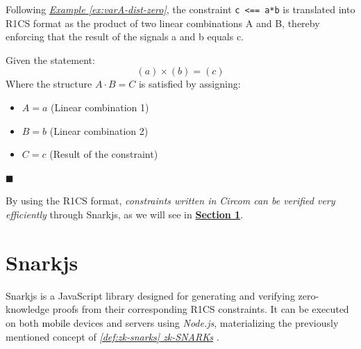 \documentclass[a4paper,12pt]{report}
\begin{document}
	\vspace{0.3cm}
	
	\noindent Following \hyperref[ex:varA-dist-zero]{\textit{Example \ref{ex:varA-dist-zero}}}, the constraint \texttt{c <== a*b} is translated into R1CS format as the product of two linear combinations A and B, thereby enforcing that the result of the signals a and b equals c.
	
	\begin{mi_ejemplo}[H]
		\caption{Multiplication transformation to R1CS format}
		\label{ex:var_zero-to-R1CS-ingles}    
		
		Given the statement:
		\begin{equation*}
			(a) \times (b) = (c)
		\end{equation*}
		Where the structure $A \cdot B = C$ is satisfied by assigning:
		\begin{itemize}
			\item $A = a$ (Linear combination 1)
			\item $B = b$ (Linear combination 2)
			\item $C = c$ (Result of the constraint)
		\end{itemize}
		
		\hspace*{\fill} $\blacksquare$
	\end{mi_ejemplo}
	
	\vspace{0.3cm}
	
	\noindent By using the R1CS format, \textit{constraints written in Circom can be verified very efficiently} through Snarkjs, as we will see in \hyperref[sec:snarkjs-ingles]{\textbf{Section \ref{sec:snarkjs-ingles}}}.
	
	\newpage
	
	\section{Snarkjs}
	\label{sec:snarkjs-ingles}
	
	\noindent Snarkjs is a JavaScript library designed for generating and verifying zero-knowledge proofs from their corresponding R1CS constraints. It can be executed on both \textcolor{black}{mobile} devices and servers using \textit{Node.js}, materializing the previously mentioned concept of \hyperref[def:zk-snarks]{\textit{ \ref{def:zk-snarks} zk-SNARKs}} \cite{thesis_clara}\cite{circom_articulo_clara}.
	
	\vspace{0.25cm}
	
\end{document}
